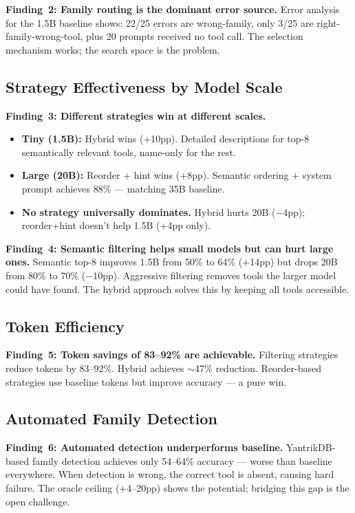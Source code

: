 \documentclass[11pt]{article}
\begin{document}
\textbf{Finding~2: Family routing is the dominant error source.} Error analysis for the 1.5B baseline shows: 22/25 errors are wrong-family, only 3/25 are right-family-wrong-tool, plus 20 prompts received no tool call. The selection mechanism works; the search space is the problem.

\subsection{Strategy Effectiveness by Model Scale}

\textbf{Finding~3: Different strategies win at different scales.}
\begin{itemize}[nosep,leftmargin=*]
  \item \textbf{Tiny (1.5B):} Hybrid wins (+10pp). Detailed descriptions for top-8 semantically relevant tools, name-only for the rest.
  \item \textbf{Large (20B):} Reorder + hint wins (+8pp). Semantic ordering + system prompt achieves 88\% --- matching 35B baseline.
  \item \textbf{No strategy universally dominates.} Hybrid hurts 20B ($-$4pp); reorder+hint doesn't help 1.5B (+4pp only).
\end{itemize}

\textbf{Finding~4: Semantic filtering helps small models but can hurt large ones.} Semantic top-8 improves 1.5B from 50\% to 64\% (+14pp) but drops 20B from 80\% to 70\% ($-$10pp). Aggressive filtering removes tools the larger model could have found. The hybrid approach solves this by keeping all tools accessible.

\subsection{Token Efficiency}

\textbf{Finding~5: Token savings of 83--92\% are achievable.} Filtering strategies reduce tokens by 83--92\%. Hybrid achieves $\sim$47\% reduction. Reorder-based strategies use baseline tokens but improve accuracy --- a pure win.

\subsection{Automated Family Detection}

\textbf{Finding~6: Automated detection underperforms baseline.} YantrikDB-based family detection achieves only 54--64\% accuracy --- worse than baseline everywhere. When detection is wrong, the correct tool is absent, causing hard failure. The oracle ceiling (+4--20pp) shows the potential; bridging this gap is the open challenge.
\end{document}

